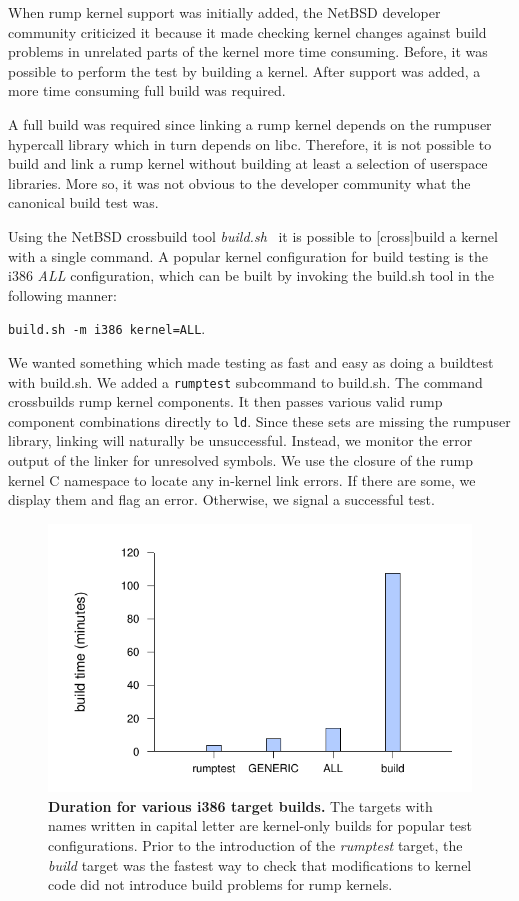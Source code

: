 When rump kernel support was initially added, the NetBSD developer
community criticized it because it made checking kernel changes
against build problems in unrelated parts of the kernel more time
consuming.  Before, it was possible to perform the test by building
a kernel.  After support was added, a more time consuming full build
was required.

A full build was required since linking a rump kernel depends on
the rumpuser hypercall library which in turn depends on libc.
Therefore, it is not possible to build and link a rump kernel
without building at least a selection of userspace libraries.
More so, it was not obvious to the developer community what the
canonical build test was.

Using the NetBSD crossbuild tool \textit{build.sh}~\cite{mewburn:build.sh}
it is possible to [cross]build a kernel with a single command.  A
popular kernel configuration for build testing is the i386 \textit{ALL}
configuration, which can be built by invoking the build.sh tool in the following manner:

\texttt{build.sh -m i386 kernel=ALL}.

We wanted something which made testing as fast and easy as doing
a buildtest with build.sh.  We added a \texttt{rumptest} subcommand
to build.sh.  The command crossbuilds rump kernel components.  It
then passes various valid rump component combinations directly to
\texttt{ld}.  Since these sets are missing the rumpuser library,
linking will naturally be unsuccessful.  Instead, we monitor the
error output of the linker for unresolved symbols.  We use the
closure of the rump kernel C namespace to locate any in-kernel link
errors.  If there are some, we display them and flag an error.
Otherwise, we signal a successful test.

\begin{figure}[t]
\includegraphics{buildtime.pdf}
\caption[Duration for various i386 target builds]{
\textbf{Duration for various i386 target builds.}
The targets with names written in capital letter are kernel-only builds
for popular test configurations.  Prior to the introduction of the
\textit{rumptest} target, the \textit{build} target was the fastest way to
check that modifications to kernel code did not introduce build problems for
rump kernels.
}
\label{fig:testbuildtime}
\end{figure}

